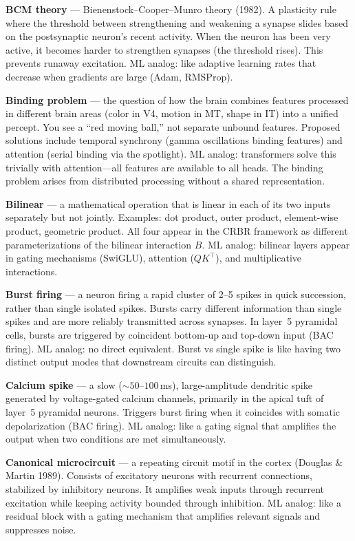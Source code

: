 \documentclass[11pt,a4paper]{article}
\begin{document}
\textbf{BCM theory} --- Bienenstock--Cooper--Munro theory (1982). A plasticity rule where the threshold between strengthening and weakening a synapse slides based on the postsynaptic neuron's recent activity. When the neuron has been very active, it becomes harder to strengthen synapses (the threshold rises). This prevents runaway excitation. ML analog: like adaptive learning rates that decrease when gradients are large (Adam, RMSProp).

\textbf{Binding problem} --- the question of how the brain combines features processed in different brain areas (color in V4, motion in MT, shape in IT) into a unified percept. You see a ``red moving ball,'' not separate unbound features. Proposed solutions include temporal synchrony (gamma oscillations binding features) and attention (serial binding via the spotlight). ML analog: transformers solve this trivially with attention---all features are available to all heads. The binding problem arises from distributed processing without a shared representation.

\textbf{Bilinear} --- a mathematical operation that is linear in each of its two inputs separately but not jointly. Examples: dot product, outer product, element-wise product, geometric product. All four appear in the CRBR framework as different parameterizations of the bilinear interaction $B$. ML analog: bilinear layers appear in gating mechanisms (SwiGLU), attention ($QK^\top$), and multiplicative interactions.

\textbf{Burst firing} --- a neuron firing a rapid cluster of 2--5 spikes in quick succession, rather than single isolated spikes. Bursts carry different information than single spikes and are more reliably transmitted across synapses. In layer~5 pyramidal cells, bursts are triggered by coincident bottom-up and top-down input (BAC firing). ML analog: no direct equivalent. Burst vs single spike is like having two distinct output modes that downstream circuits can distinguish.

\textbf{Calcium spike} --- a slow (${\sim}50\text{--}100$\,ms), large-amplitude dendritic spike generated by voltage-gated calcium channels, primarily in the apical tuft of layer~5 pyramidal neurons. Triggers burst firing when it coincides with somatic depolarization (BAC firing). ML analog: like a gating signal that amplifies the output when two conditions are met simultaneously.

\textbf{Canonical microcircuit} --- a repeating circuit motif in the cortex (Douglas \& Martin 1989). Consists of excitatory neurons with recurrent connections, stabilized by inhibitory neurons. It amplifies weak inputs through recurrent excitation while keeping activity bounded through inhibition. ML analog: like a residual block with a gating mechanism that amplifies relevant signals and suppresses noise.
\end{document}
